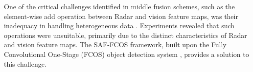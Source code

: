\documentclass[report.tex]{subfiles}
\begin{document}

    One of the critical challenges identified in middle fusion schemes, such as the element-wise add operation between Radar and vision feature maps, was their inadequacy in handling heterogeneous data \cite{chadwick2019distant}. Experiments revealed that such operations were unsuitable, primarily due to the distinct characteristics of Radar and vision feature maps. The SAF-FCOS framework, built upon the Fully Convolutional One-Stage (FCOS) object detection system \cite{tian2019fcos}, provides a solution to this challenge.
    
    


\end{document}
